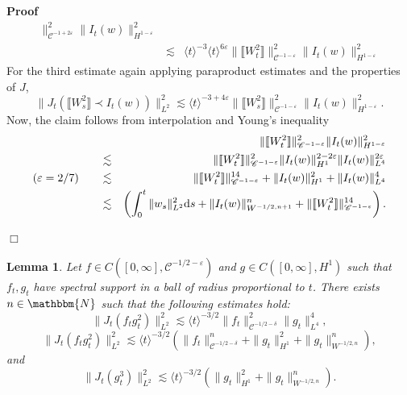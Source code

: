 \documentclass[11pt]{article}
\newcommand{\mathd}{\mathrm{d}}
\newenvironment{proof}{\noindent\textbf{Proof\ }}{\hspace*{\fill}$\Box$\medskip}
\newtheorem{lemma}{Lemma}
\newcommand{\VV}{\mathscr{C}}
\begin{document}
\begin{proof}
\[\begin{array}{lll}
       \|^2_{\VV^{- 1 + 2 \varepsilon}} \| I_t (w) \|^2_{H^{1 -
       \varepsilon}}\\
       & \lesssim & \langle t \rangle^{- 3} \langle t \rangle^{6 \varepsilon}
       \| \llbracket W_t^2 \rrbracket \|^2_{\VV^{- 1 - \varepsilon}} \| I_t
       (w) \|^2_{H^{1 - \varepsilon}}
     \end{array} \]
  For the third estimate again applying paraproduct estimates and the
  properties of $J$,
  \[ \| J_t (\llbracket W_s^2 \rrbracket \prec I_t (w)) \|^2_{L^2} \lesssim
     \langle t \rangle^{- 3 + 4 \varepsilon} \| \llbracket W_s^2 \rrbracket
     \|^2_{\VV^{- 1 - \varepsilon}} \| I_t (w) \|^2_{H^{1 - \varepsilon}} . \]
  Now, the claim follows from interpolation and Young's inequality
  \begin{eqnarray*}
    &  & \| \llbracket W_t^2 \rrbracket \|^2_{\VV^{- 1 - \varepsilon}} \| I_t
    (w) \|^2_{H^{1 - \varepsilon}}\\
    & \lesssim & \| \llbracket W_t^2 \rrbracket \|^2_{\VV^{- 1 -
    \varepsilon}} \| I_t (w) \|^{2 - 2 \varepsilon}_{H^1} \| I_t (w) \|^{2
    \varepsilon}_{L^4}\\
    \small{(\varepsilon = 2 / 7)} \qquad & \lesssim & \| \llbracket W_t^2
    \rrbracket \|^{14}_{\VV^{- 1 - \varepsilon}} + \| I_t (w) \|^2_{H^1} + \|
    I_t (w) \|^4_{L^4}\\
    & \lesssim & \left( \int^t_0 \| w_s \|_{L^2}^2 \mathd s + \| I_t (w)
    \|^n_{W^{- 1 / 2, n + 1}} + \| \llbracket W_t^2 \rrbracket \|^{14}_{\VV^{-
    1 - \varepsilon}} \right) .
  \end{eqnarray*}
  
\end{proof}

\begin{lemma}
  \label{analyticestimate2}Let $f \in C \left( [0, \infty], \VV^{- 1 / 2 -
  \varepsilon} \right)$ and $g \in C ([0, \infty], H^1)$ such that $f_t, g_t$
  have spectral support in a ball of radius proportional to $t$. There exists
  $n \in \mathbbm{N}$ such that the following estimates hold:
  \[ \| J_t (f_t g_t^2) \|^2_{L^2} \lesssim \langle t \rangle^{- 3 / 2} \| f_t
     \|_{\VV^{- 1 / 2 - \delta}}^2 \| g_t \|^4_{L^4}, \]
  \[ \| J_t (f_t g_t^2) \|^2_{L^2} \lesssim \langle t \rangle^{- 3 / 2} \left(
     \| f_t \|^n_{\VV^{- 1 / 2 - \delta}} + \| g_t \|^2_{H^1} + \| g_t
     \|_{W^{- 1 / 2, n}}^n \right), \]
  and
  \[ \| J_t (g_t^3) \|^2_{L^2} \lesssim \langle t \rangle^{- 3 / 2} (\| g_t
     \|_{H^1}^2 + \| g_t \|_{W^{- 1 / 2, n}}^n) . \]
\end{lemma}
\end{document}
